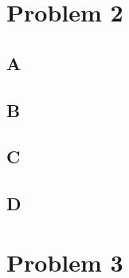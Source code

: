 \documentclass{article}
\begin{document}
    \section{Problem 2}
        \subsection{A}
        \subsection{B}
        \subsection{C}
        \subsection{D}
    \newpage
    \section{Problem 3}
\end{document}
